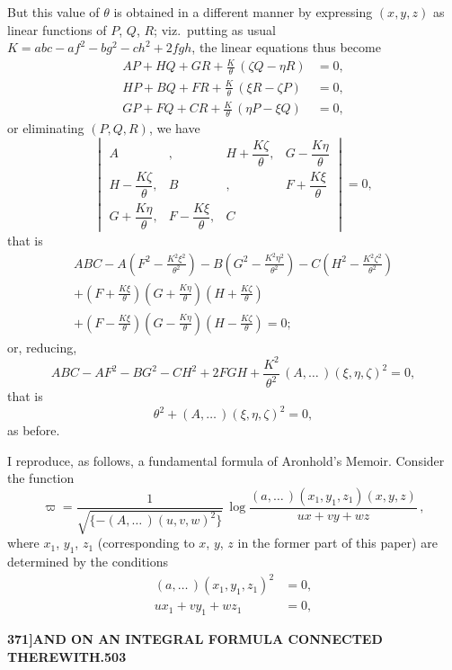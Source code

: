 \documentclass[11pt,a4paper]{article}
\begin{document}
But this value of $\theta$ is obtained in a different manner by expressing $(x, y, z)$ as linear functions of $P$, $Q$, $R$; viz.~putting as usual $K = abc - af^{2} - bg^{2} - ch^{2} + 2fgh$, the linear equations thus become
\begin{align*}
AP + HQ + GR + \frac{K}{\theta}\,(\zeta Q - \eta R) &= 0,\\
HP + BQ + FR + \frac{K}{\theta}\,(\xi R - \zeta P) &= 0,\\
GP + FQ + CR + \frac{K}{\theta}\,(\eta P - \xi Q) &= 0,
\end{align*}
or eliminating $(P, Q, R)$, we have
\[
\begin{vmatrix}
A & , & H + \dfrac{K\zeta}{\theta}, & G - \dfrac{K\eta}{\theta} \\[6pt]
H - \dfrac{K\zeta}{\theta}, & B & , & F + \dfrac{K\xi}{\theta} \\[6pt]
G + \dfrac{K\eta}{\theta}, & F - \dfrac{K\xi}{\theta}, & C
\end{vmatrix}
= 0,
\]
that is
\begin{multline*}
ABC - A\left(F^{2} - \frac{K^{2}\xi^{2}}{\theta^{2}}\right)
- B\left(G^{2} - \frac{K^{2}\eta^{2}}{\theta^{2}}\right)
- C\left(H^{2} - \frac{K^{2}\zeta^{2}}{\theta^{2}}\right)\\
+ \left(F + \frac{K\xi}{\theta}\right)\left(G + \frac{K\eta}{\theta}\right)\left(H + \frac{K\zeta}{\theta}\right)\\
+ \left(F - \frac{K\xi}{\theta}\right)\left(G - \frac{K\eta}{\theta}\right)\left(H - \frac{K\zeta}{\theta}\right) = 0;
\end{multline*}
or, reducing,
\[
ABC - AF^{2} - BG^{2} - CH^{2} + 2FGH + \frac{K^{2}}{\theta^{2}}\,(A, \ldots \,)(\xi, \eta, \zeta)^{2} = 0,
\]
that is
\[
\theta^{2} + (A, \ldots \,)(\xi, \eta, \zeta)^{2} = 0,
\]
as before.

I reproduce, as follows, a fundamental formula of Aronhold's Memoir. Consider the function
\[
\varpi = \frac{1}{\sqrt{\{- (A, \ldots \,)(u, v, w)^{2}\}}}\,
\log \frac{(a, \ldots \,)(x_{1}, y_{1}, z_{1})(x, y, z)}{ux + vy + wz}\,,
\]
where $x_{1}$, $y_{1}$, $z_{1}$ (corresponding to $x$, $y$, $z$ in the former part of this paper) are determined by the conditions
\begin{align*}
(a, \ldots \,)(x_{1}, y_{1}, z_{1})^{2} &= 0,\\
ux_{1} + vy_{1} + wz_{1} &= 0,
\end{align*}

\newpage
\begin{flushright}
\textbf{371]\hspace{1em}AND ON AN INTEGRAL FORMULA CONNECTED THEREWITH.\hfill503}
\end{flushright}
\end{document}
